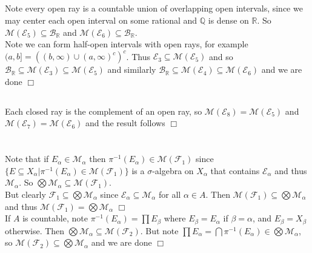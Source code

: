 \documentclass{article}
\begin{document}
\subsection{}
Note every open ray is a countable union of overlapping open intervals, since we may center each open interval on some rational and $\mathbb{Q}$ is dense on $\mathbb{R}$. So $\mathcal{M}(\mathcal{E}_5) \subseteq \mathcal{B}_\mathbb{R}$ and $\mathcal{M}(\mathcal{E}_6) \subseteq \mathcal{B}_\mathbb{R}$.\\
Note we can form half-open intervals with open rays, for example $(a,b] = \left( (b,\infty) \cup (a,\infty)^c \right)^c$. Thus $\mathcal{E}_3 \subseteq \mathcal{M}(\mathcal{E}_5)$ and so $\mathcal{B}_\mathbb{R} \subseteq \mathcal{M}(\mathcal{E}_3) \subseteq \mathcal{M}(\mathcal{E}_5)$ and similarly $\mathcal{B}_\mathbb{R} \subseteq \mathcal{M}(\mathcal{E}_4) \subseteq \mathcal{M}(\mathcal{E}_6)$ and we are done $\Box$
\subsection{}
Each closed ray is the complement of an open ray, so $\mathcal{M}(\mathcal{E}_8) = \mathcal{M}(\mathcal{E}_5)$ and $\mathcal{M}(\mathcal{E}_7) = \mathcal{M}(\mathcal{E}_6)$ and the result follows $\Box$

\section{}
Note that if $E_\alpha \in \mathcal{M}_\alpha$ then $\pi^{-1}(E_\alpha) \in \mathcal{M}(\mathcal{F}_1)$ since $\{ E \subseteq X_\alpha | \pi^{-1}(E_\alpha) \in \mathcal{M}(\mathcal{F}_1) \}$ is a $\sigma$-algebra on $X_\alpha$ that contains $\mathcal{E}_\alpha$ and thus $\mathcal{M}_\alpha$. So $\bigotimes \mathcal{M}_\alpha \subseteq \mathcal{M}(\mathcal{F}_1)$.\\
But clearly $\mathcal{F}_1 \subseteq \bigotimes \mathcal{M}_\alpha$ since $\mathcal{E}_\alpha \subseteq \mathcal{M}_\alpha$ for all $\alpha \in A$. Then $\mathcal{M}(\mathcal{F}_1) \subseteq \bigotimes \mathcal{M}_\alpha$ and thus $\mathcal{M}(\mathcal{F}_1) = \bigotimes \mathcal{M}_\alpha$ $\Box$\\
If $A$ is countable, note $\pi^{-1}(E_\alpha) = \prod E_\beta$ where $E_\beta = E_\alpha$ if $\beta = \alpha$, and $E_\beta = X_\beta$ otherwise. Then $\bigotimes \mathcal{M}_\alpha \subseteq \mathcal{M}(\mathcal{F}_2)$. But note $\prod E_\alpha = \bigcap \pi^{-1}(E_\alpha) \in \bigotimes \mathcal{M}_\alpha$, so $\mathcal{M}(\mathcal{F}_2) \subseteq \bigotimes \mathcal{M}_\alpha$ and we are done $\Box$
\end{document}
